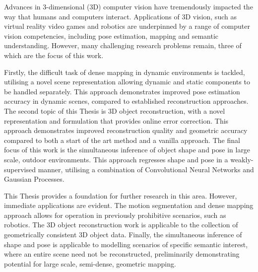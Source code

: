 Advances in 3-dimensional (3D) computer vision have tremendously impacted the way that humans and computers interact. 
Applications of 3D vision, such as virtual reality video games and robotics are underpinned by a range of 
computer vision competencies, including pose estimation, mapping and semantic understanding. However, 
many challenging research problems remain, three of which are the focus of this work.

Firstly, the difficult task of dense mapping in dynamic environments is tackled, utilising a 
novel scene representation allowing dynamic and static components to be handled separately. This approach demonstrates improved 
pose estimation accuracy in dynamic scenes, compared to established reconstruction approaches. The second topic of this Thesis is 
3D object reconstruction, with a novel representation and formulation that provides online error correction. This approach demonstrates 
improved reconstruction quality and geometric accuracy compared to both a start of the art method and a vanilla approach. The final focus 
of this work is the simultaneous inference of object shape and pose in large scale, outdoor environments. 
This approach regresses shape and pose in a weakly-supervised manner, utilising a combination of Convolutional Neural Networks 
and Gaussian Processes.

This Thesis provides a foundation for further research in this area. However, immediate applications are evident. The motion 
segmentation and dense mapping approach allows for operation in previously prohibitive scenarios, such as robotics. The 3D object 
reconstruction work is applicable to the collection of geometrically consistent 3D object data. Finally, the simultaneous inference of 
shape and pose is applicable to modelling scenarios of specific semantic interest, where an entire scene need not be reconstructed, 
preliminarily demonstrating potential for large scale, semi-dense, geometric mapping.